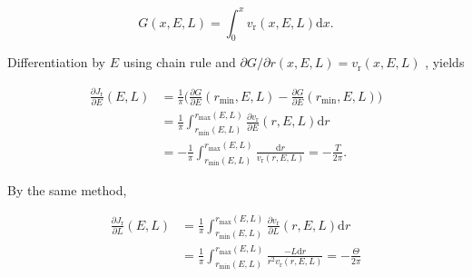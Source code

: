 \documentclass[11pt]{article}
\newcommand{\rr}{\mathrm{r}}
\newcommand{\vr}{v_{\rr}}
\newcommand{\rd}{{\mathrm{d}}}
\newcommand{\rmax}{r_{\max}}
\newcommand{\rmin}{r_{\min}}
\newcommand{\Jr}{J_{\mathrm{r}}}
\begin{document}
\begin{appendices}
\begin{equation}
  G(x,E,L) = \int_{0}^{x} \vr(x,E,L) \rd x .
  \label{eq:Jr_eq_G}
\end{equation}

Differentiation by $E$ using chain rule and $\partial G/\partial r (x,E,L) = \vr(x,E,L)$ , yields

\begin{align*}
  \frac{\partial \Jr}{\partial E}(E,L) &= \frac{1}{\pi} \bigg( \frac{\partial G}{\partial E}(\rmin,E,L)- \frac{\partial G}{\partial E}(\rmin,E,L)\bigg)
  \label{eq:dJrdE} \\
  &= \frac{1}{\pi} \int_{\rmin(E,L)}^{\rmax(E,L)} \frac{\partial \vr}{\partial E} (r,E,L) \rd r \\
  &= - \frac{1}{\pi} \int_{\rmin(E,L)}^{\rmax(E,L)} \frac{\rd r}{\vr(r,E,L)} = -\frac{T}{2\pi} .
\end{align*}

By the same method,

\begin{align*}
  \frac{\partial \Jr}{\partial L}(E,L) &= \frac{1}{\pi} \int_{\rmin(E,L)}^{\rmax(E,L)} \frac{\partial \vr}{\partial L} (r,E,L) \rd r \\
  &= \frac{1}{\pi} \int_{\rmin(E,L)}^{\rmax(E,L)} \frac{- L \rd r }{r^{2} \vr(r,E,L)} = - \frac{\Theta}{2\pi}
\end{align*}

\end{appendices}
\end{document}
